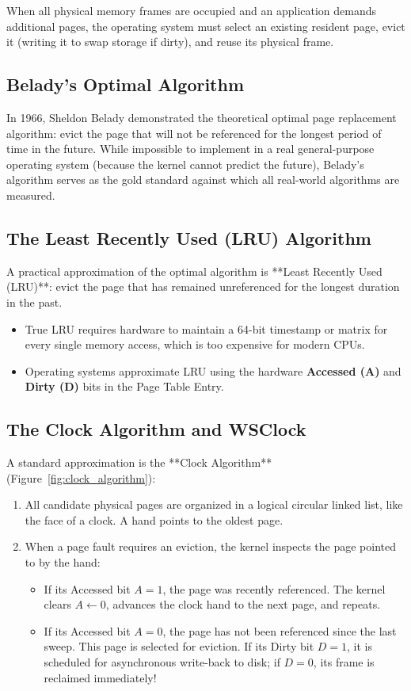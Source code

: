 When all physical memory frames are occupied and an application demands additional pages, the operating system must select an existing resident page, evict it (writing it to swap storage if dirty), and reuse its physical frame.

\subsection{Belady's Optimal Algorithm}
In 1966, Sheldon Belady demonstrated the theoretical optimal page replacement algorithm: evict the page that will not be referenced for the longest period of time in the future. While impossible to implement in a real general-purpose operating system (because the kernel cannot predict the future), Belady's algorithm serves as the gold standard against which all real-world algorithms are measured.

\subsection{The Least Recently Used (LRU) Algorithm}
A practical approximation of the optimal algorithm is **Least Recently Used (LRU)**: evict the page that has remained unreferenced for the longest duration in the past. 
\begin{itemize}
    \item True LRU requires hardware to maintain a 64-bit timestamp or matrix for every single memory access, which is too expensive for modern CPUs.
    \item Operating systems approximate LRU using the hardware \textbf{Accessed (A)} and \textbf{Dirty (D)} bits in the Page Table Entry.
\end{itemize}

\subsection{The Clock Algorithm and WSClock}
A standard approximation is the **Clock Algorithm** (Figure~\ref{fig:clock_algorithm}):
\begin{enumerate}
    \item All candidate physical pages are organized in a logical circular linked list, like the face of a clock. A hand points to the oldest page.
    \item When a page fault requires an eviction, the kernel inspects the page pointed to by the hand:
    \begin{itemize}
        \item If its Accessed bit $A = 1$, the page was recently referenced. The kernel clears $A \leftarrow 0$, advances the clock hand to the next page, and repeats.
        \item If its Accessed bit $A = 0$, the page has not been referenced since the last sweep. This page is selected for eviction. If its Dirty bit $D = 1$, it is scheduled for asynchronous write-back to disk; if $D = 0$, its frame is reclaimed immediately!
    \end{itemize}
\end{enumerate}

